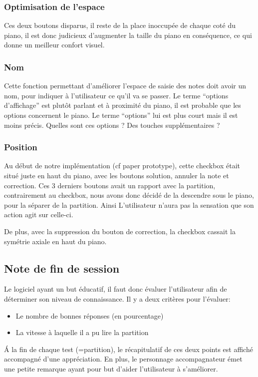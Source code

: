 \documentclass{article}
\begin{document}
\subsubsection{Optimisation de l'espace}
Ces deux boutons disparus, il reste de la place inoccupée de chaque coté du piano, il est donc judicieux d'augmenter la taille 
du piano en conséquence, ce qui donne un meilleur confort visuel.

\subsubsection{Nom}
Cette fonction permettant d'améliorer l'espace de saisie des notes doit avoir un nom, pour indiquer à l'utilisateur ce qu'il va se 
passer. Le terme ``options d'affichage'' est plutôt parlant et à proximité du piano, il est probable que les options concernent le 
piano.
Le terme ``options'' lui est plus court mais il est moins précis. Quelles sont ces options ? Des touches supplémentaires ?

\subsubsection{Position}
Au début de notre implémentation (cf paper prototype), cette checkbox était situé juste en haut du piano, avec les boutons
solution, annuler la note et correction. Ces 3 derniers boutons avait un rapport avec la partition, contrairement au checkbox,
nous avons donc décidé de la descendre sous le piano, pour la séparer de la partition. Ainsi L'utilisateur n'aura pas la sensation que
son action agit sur celle-ci.


De plus, avec la suppression du bouton de correction, la checkbox cassait la symétrie axiale en haut du piano. 
\subsection{Note de fin de session}
Le logiciel ayant un but éducatif, il faut donc évaluer l'utilisateur afin de déterminer son niveau de connaissance.
Il y a deux critères pour l'évaluer:
\begin{itemize}
 \item Le nombre de bonnes réponses (en pourcentage)
 \item La vitesse à laquelle il a pu lire la partition
\end{itemize}
\'A la fin de chaque test (=partition), le récapitulatif de ces deux points est affiché accompagné d'une appréciation.
En plus, le personnage accompagnateur émet une petite remarque ayant pour but d'aider l'utilisateur à s'améliorer.
\end{document}
